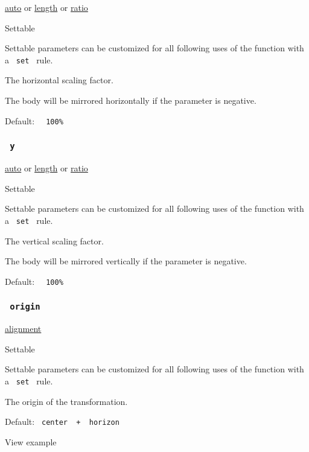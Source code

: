 \href{/docs/reference/foundations/auto/}{auto} {or}
\href{/docs/reference/layout/length/}{length} {or}
\href{/docs/reference/layout/ratio/}{ratio}

{{ Settable }}

\label{parameters-x-settable-tooltip}
Settable parameters can be customized for all following uses of the
function with a \texttt{\ set\ } rule.

The horizontal scaling factor.

The body will be mirrored horizontally if the parameter is negative.

Default: \texttt{\ }{\texttt{\ 100\%\ }}\texttt{\ }

\subsubsection{\texorpdfstring{\texttt{\ y\ }}{ y }}\label{parameters-y}

\href{/docs/reference/foundations/auto/}{auto} {or}
\href{/docs/reference/layout/length/}{length} {or}
\href{/docs/reference/layout/ratio/}{ratio}

{{ Settable }}

\label{parameters-y-settable-tooltip}
Settable parameters can be customized for all following uses of the
function with a \texttt{\ set\ } rule.

The vertical scaling factor.

The body will be mirrored vertically if the parameter is negative.

Default: \texttt{\ }{\texttt{\ 100\%\ }}\texttt{\ }

\subsubsection{\texorpdfstring{\texttt{\ origin\ }}{ origin }}\label{parameters-origin}

\href{/docs/reference/layout/alignment/}{alignment}

{{ Settable }}

\label{parameters-origin-settable-tooltip}
Settable parameters can be customized for all following uses of the
function with a \texttt{\ set\ } rule.

The origin of the transformation.

Default: \texttt{\ center\ }{\texttt{\ +\ }}\texttt{\ horizon\ }


View example

